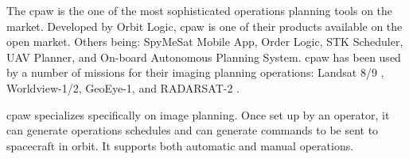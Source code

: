 The \gls{cpaw} is the one of the most sophisticated operations planning tools on the market. 
Developed by Orbit Logic, \gls{cpaw} is one of their products available on the open market. 
Others being: SpyMeSat Mobile App, Order Logic, STK Scheduler, UAV Planner, and On-board Autonomous Planning System.
\gls{cpaw} has been used by a number of missions for their imaging planning operations: Landsat 8/9 \cite{gokhale_mission_nodate}, Worldview-1/2, GeoEye-1, and RADARSAT-2 \cite{herz_eo_2014}.


\gls{cpaw} specializes specifically on image planning. 
Once set up by an operator, it can generate operations schedules and can generate commands to be sent to spacecraft in orbit.
It supports both automatic and manual operations.







